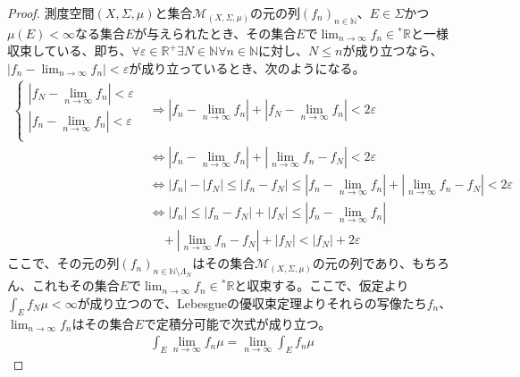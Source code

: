 \documentclass[dvipdfmx]{jsarticle}
\begin{document}
\begin{proof}
測度空間$(X,\varSigma,\mu)$と集合$\mathcal{M}_{(X,\varSigma,\mu)}$の元の列$\left( f_{n} \right)_{n \in \mathbb{N}}$、$E \in \varSigma$かつ$\mu(E) < \infty$なる集合$E$が与えられたとき、その集合$E$で$\lim_{n \rightarrow \infty}f_{n} \in{}^{*}\mathbb{R}$と一様収束している、即ち、$\forall\varepsilon \in \mathbb{R}^{+}\exists N \in \mathbb{N}\forall n \in \mathbb{N}$に対し、$N \leq n$が成り立つなら、$\left| f_{n} - \lim_{n \rightarrow \infty}f_{n} \right| < \varepsilon$が成り立っているとき、次のようになる。
\begin{align*}
\left\{ \begin{matrix}
\left| f_{N} - \lim_{n \rightarrow \infty}f_{n} \right| < \varepsilon \\
\left| f_{n} - \lim_{n \rightarrow \infty}f_{n} \right| < \varepsilon \\
\end{matrix} \right. &\Rightarrow \left| f_{n} - \lim_{n \rightarrow \infty}f_{n} \right| + \left| f_{N} - \lim_{n \rightarrow \infty}f_{n} \right| < 2\varepsilon\\
&\Leftrightarrow \left| f_{n} - \lim_{n \rightarrow \infty}f_{n} \right| + \left| \lim_{n \rightarrow \infty}f_{n} - f_{N} \right| < 2\varepsilon\\
&\Leftrightarrow \left| f_{n} \right| - \left| f_{N} \right| \leq \left| f_{n} - f_{N} \right| \leq \left| f_{n} - \lim_{n \rightarrow \infty}f_{n} \right| + \left| \lim_{n \rightarrow \infty}f_{n} - f_{N} \right| < 2\varepsilon\\
&\Leftrightarrow \left| f_{n} \right| \leq \left| f_{n} - f_{N} \right| + \left| f_{N} \right| \leq \left| f_{n} - \lim_{n \rightarrow \infty}f_{n} \right| \\
&\quad + \left| \lim_{n \rightarrow \infty}f_{n} - f_{N} \right| + \left| f_{N} \right| < \left| f_{N} \right| + 2\varepsilon
\end{align*}
ここで、その元の列$\left( f_{n} \right)_{n \in \mathbb{N} \setminus \varLambda_{N}}$はその集合$\mathcal{M}_{(X,\varSigma,\mu)}$の元の列であり、もちろん、これもその集合$E$で$\lim_{n \rightarrow \infty}f_{n} \in{}^{*}\mathbb{R}$と収束する。ここで、仮定より$\int_{E} {f_{N}\mu} < \infty$が成り立つので、Lebesgueの優収束定理よりそれらの写像たち$f_{n}$、$\lim_{n \rightarrow \infty}f_{n}$はその集合$E$で定積分可能で次式が成り立つ。
\begin{align*}
\int_{E} {\lim_{n \rightarrow \infty}f_{n}\mu} = \lim_{n \rightarrow \infty}{\int_{E} {f_{n}\mu}}
\end{align*}
\end{proof}
\end{document}
